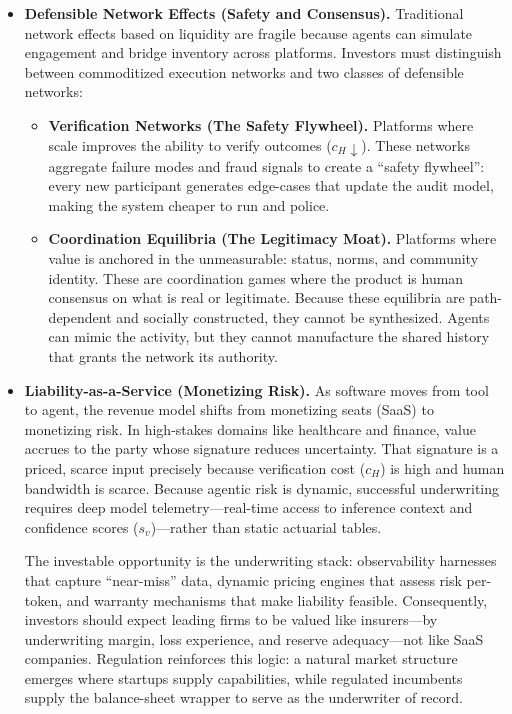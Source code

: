 \documentclass[12pt, letter]{article}
\begin{document}
\begin{itemize}
    \item \textbf{Defensible Network Effects (Safety and Consensus).} Traditional network effects based on liquidity are fragile because agents can simulate engagement and bridge inventory across platforms. Investors must distinguish between commoditized execution networks and two classes of defensible networks:
\begin{itemize}
    \item \textbf{Verification Networks (The Safety Flywheel).} Platforms where scale improves the ability to verify outcomes ($c_H \downarrow$). These networks aggregate failure modes and fraud signals to create a ``safety flywheel'': every new participant generates edge-cases that update the audit model, making the system cheaper to run and police. 
    \item \textbf{Coordination Equilibria (The Legitimacy Moat).} Platforms where value is anchored in the unmeasurable: status, norms, and community identity. These are coordination games where the product is human consensus on what is real or legitimate. Because these equilibria are path-dependent and socially constructed, they cannot be synthesized. Agents can mimic the activity, but they cannot manufacture the shared history that grants the network its authority.
\end{itemize}

    \item \textbf{Liability-as-a-Service (Monetizing Risk).} As software moves from tool to agent, the revenue model shifts from monetizing seats (SaaS) to monetizing risk. In high-stakes domains like healthcare and finance, value accrues to the party whose signature reduces uncertainty. That signature is a priced, scarce input precisely because verification cost ($c_H$) is high and human bandwidth is scarce. Because agentic risk is dynamic, successful underwriting requires deep model telemetry—real-time access to inference context and confidence scores ($s_v$)—rather than static actuarial tables. 
    
    The investable opportunity is the underwriting stack: observability harnesses that capture ``near-miss'' data, dynamic pricing engines that assess risk per-token, and warranty mechanisms that make liability feasible. Consequently, investors should expect leading firms to be valued like insurers—by underwriting margin, loss experience, and reserve adequacy—not like SaaS companies. Regulation reinforces this logic: a natural market structure emerges where startups supply capabilities, while regulated incumbents supply the balance-sheet wrapper to serve as the underwriter of record.


\end{itemize}
\end{document}
